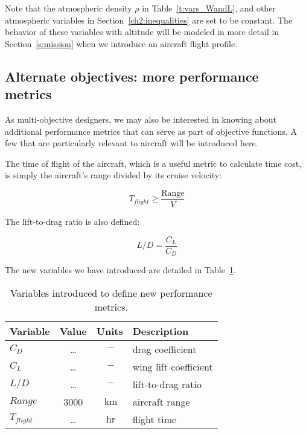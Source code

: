 Note that the atmospheric density $\rho$ in Table~\ref{t:vars_WandL}, and other
atmospheric variables in Section~\ref{ch2:inequalities} are set
to be constant. The behavior of these variables with altitude
will be modeled in more detail in Section~\ref{s:mission} when we
introduce an aircraft flight profile.

\subsection{Alternate objectives: more performance metrics}
\label{s:altobj}

As multi-objective designers, we may also be interested in knowing about
additional performance metrics that can serve as part of objective functions. A
few that are particularly relevant to aircraft will be introduced here.

The time of flight of the aircraft, which is a useful metric to calculate
time cost, is simply the aircraft's range divided by its cruise velocity:

\begin{equation}
    T_{flight} \geq \frac{\mathrm{Range}}{V}
\end{equation}

The lift-to-drag ratio is also defined: 

\begin{equation}
    L/D = \frac{C_L}{C_D}    
\end{equation}

The new variables we have introduced are detailed in Table~\ref{t:vars_perfMetrics}.

\begin{footnotesize}
\begin{table}
    \centering
    \begin{tabular}{ l c c l}
        \toprule
        \textbf{Variable} & \textbf{Value} & \textbf{Units} & \textbf{Description} \\
        \midrule
        $C_D$ & \ldots & $~\mathrm{-}$ & drag coefficient \\
        $C_L$ & \ldots & $~\mathrm{-}$ & wing lift coefficient \\
        $L/D$ & \ldots & $~\mathrm{-}$ & lift-to-drag ratio \\
        $Range$ & 3000 & $~\mathrm{km}$ & aircraft range \\
        $T_{flight}$ & \ldots & $~\mathrm{hr}$ & flight time \\
        \bottomrule
    \end{tabular}
    \caption{Variables introduced to define new performance metrics.}
    \label{t:vars_perfMetrics}
\end{table} \end{footnotesize}


